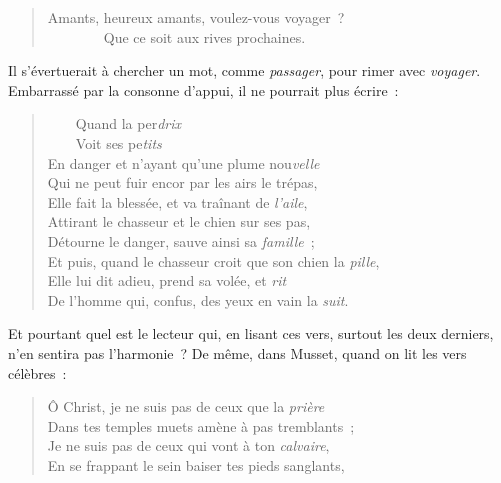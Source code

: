\documentclass[french,twoside]{book} %
\begin{document}
\begin{verse}
Amants, heureux amants, voulez-vous voyager ?\\
        Que ce soit aux rives prochaines.\\
\end{verse}

\noindent Il s’évertuerait à chercher un mot, comme \emph{passager}, pour rimer avec \emph{voyager}. Embarrassé par la consonne d’appui, il ne pourrait plus écrire :\par


\begin{verse}
    Quand la per\emph{drix}\\
    Voit ses pe\emph{tits}\\
En danger et n’ayant qu’une plume nou\emph{velle}\\
Qui ne peut fuir encor par les airs le trépas,\\
Elle fait la blessée, et va traînant de \emph{l’aile},\\
Attirant le chasseur et le chien sur ses pas,\\
Détourne le danger, sauve ainsi sa \emph{famille} ;\\
Et puis, quand le chasseur croit que son chien la \emph{pille},\\
Elle lui dit adieu, prend sa volée, et \emph{rit}\\
De l’homme qui, confus, des yeux en vain la \emph{suit}.\\
\end{verse}

\noindent Et pourtant quel est le lecteur qui, en lisant ces vers, surtout les deux derniers, n’en sentira pas l’harmonie ? De même, dans Musset, quand on lit les vers célèbres :\par


\begin{verse}
Ô Christ, je ne suis pas de ceux que la \emph{prière}\\
Dans tes temples muets amène à pas tremblants ;\\
Je ne suis pas de ceux qui vont à ton \emph{calvaire},\\
En se frappant le sein baiser tes pieds sanglants,\\
\end{verse}
\end{document}
